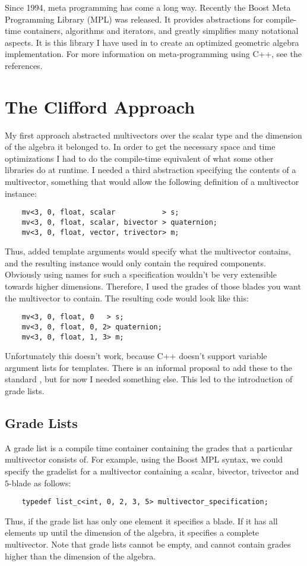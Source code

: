\documentclass[10pt]{article}
\begin{document}
Since 1994, meta programming has come a long way. Recently the
Boost Meta Programming Library (MPL) \cite{bib:boost mpl} was
released. It provides abstractions for compile-time containers,
algorithms and iterators, and greatly simplifies many notational
aspects. It is this library I have used in to create an optimized
geometric algebra implementation. For more information on
meta-programming using C++, see the references. \cite{bib:todd
velhuizen meta programming} \cite{bib:boost mpl} \cite{bib:modern
c++ design}

\section{The Clifford Approach}

My first approach abstracted multivectors over the scalar type and
the dimension of the algebra it belonged to. In order to get the
necessary space and time optimizations I had to do the
compile-time equivalent of what some other libraries do at
runtime. I needed a third abstraction specifying the contents of a
multivector, something that would allow the following definition
of a multivector instance:
\begin{verbatim}
    mv<3, 0, float, scalar           > s;
    mv<3, 0, float, scalar, bivector > quaternion;
    mv<3, 0, float, vector, trivector> m;
\end{verbatim}
Thus, added template arguments would specify what the multivector
contains, and the resulting instance would only contain the
required components. Obviously using names for such a
specification wouldn't be very extensible towards higher
dimensions. Therefore, I used the grades of those blades you want
the multivector to contain. The resulting code would look like
this:
\begin{verbatim}
    mv<3, 0, float, 0   > s;
    mv<3, 0, float, 0, 2> quaternion;
    mv<3, 0, float, 1, 3> m;
\end{verbatim}
Unfortunately this doesn't work, because C++ doesn't support
variable argument lists for templates. There is an informal
proposal to add these to the standard \cite{bib:vandevoorde}, but
for now I needed something else. This led to the introduction of
grade lists.

\subsection{Grade Lists}

A grade list is a compile time container containing the grades
that a particular multivector consists of. For example, using the
Boost MPL syntax, we could specify the gradelist for a multivector
containing a scalar, bivector, trivector and $5$-blade as follows:
\begin{verbatim}
    typedef list_c<int, 0, 2, 3, 5> multivector_specification;
\end{verbatim}
Thus, if the grade list has only one element it specifies a blade.
If it has all elements up until the dimension of the algebra, it
specifies a complete multivector. Note that grade lists cannot be
empty, and cannot contain grades higher than the dimension of the
algebra.
\end{document}
